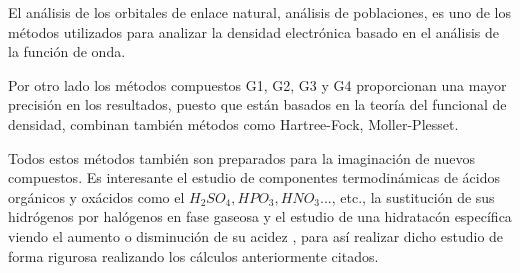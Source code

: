 El análisis de los orbitales de enlace natural, análisis de poblaciones, es uno de los métodos utilizados para analizar la densidad electrónica basado en el análisis de la función de onda.

Por otro lado los métodos compuestos G1, G2, G3 y G4 proporcionan una mayor precisión en los resultados, puesto que están basados en la teoría del funcional de densidad, combinan también métodos como Hartree-Fock, Moller-Plesset.

Todos estos métodos también son preparados para la imaginación de nuevos compuestos. Es interesante el estudio de componentes termodinámicas de ácidos orgánicos y oxácidos como el $H_2SO_4, HPO_3, HNO_3...$, etc., la sustitución de sus hidrógenos por halógenos en fase gaseosa y el estudio de una hidratacón específica viendo el aumento o disminución de su acidez \cite{quimica3}, para así realizar dicho estudio de forma rigurosa realizando los cálculos anteriormente citados.
